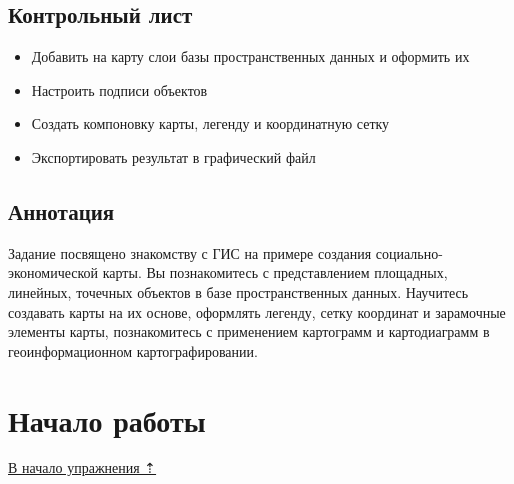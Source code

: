 \documentclass[12pt,]{book}
\providecommand{\tightlist}{%
  \setlength{\itemsep}{0pt}\setlength{\parskip}{0pt}}
\begin{document}
\hypertarget{map-design-economic-control}{%
\subsection{Контрольный лист}\label{map-design-economic-control}}

\begin{itemize}
\tightlist
\item
  Добавить на карту слои базы пространственных данных и оформить их
\item
  Настроить подписи объектов
\item
  Создать компоновку карты, легенду и координатную сетку
\item
  Экспортировать результат в графический файл
\end{itemize}

\hypertarget{map-design-economic-annotation}{%
\subsection{Аннотация}\label{map-design-economic-annotation}}

Задание посвящено знакомству с ГИС на примере создания социально-экономической карты. Вы познакомитесь с представлением площадных, линейных, точечных объектов в базе пространственных данных. Научитесь создавать карты на их основе, оформлять легенду, сетку координат и зарамочные элементы карты, познакомитесь с применением картограмм и картодиаграмм в геоинформационном картографировании.

\hypertarget{map-design-economic-begin}{%
\section{Начало работы}\label{map-design-economic-begin}}

\protect\hyperlink{map-design-economic}{В начало упражнения ⇡}
\end{document}
